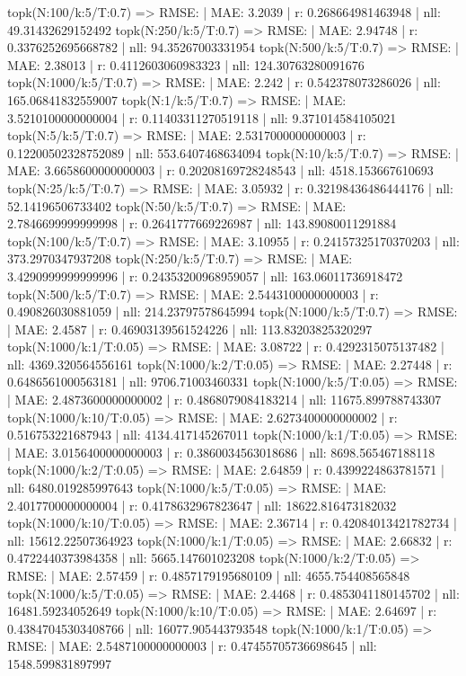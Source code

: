 topk(N:100/k:5/T:0.7) => RMSE: | MAE: 3.2039 | r: 0.268664981463948 | nll: 49.31432629152492
topk(N:250/k:5/T:0.7) => RMSE: | MAE: 2.94748 | r: 0.3376252695668782 | nll: 94.35267003331954
topk(N:500/k:5/T:0.7) => RMSE: | MAE: 2.38013 | r: 0.4112603060983323 | nll: 124.30763280091676
topk(N:1000/k:5/T:0.7) => RMSE: | MAE: 2.242 | r: 0.542378073286026 | nll: 165.06841832559007
topk(N:1/k:5/T:0.7) => RMSE: | MAE: 3.5210100000000004 | r: 0.11403311270519118 | nll: 9.371014584105021
topk(N:5/k:5/T:0.7) => RMSE: | MAE: 2.5317000000000003 | r: 0.12200502328752089 | nll: 553.6407468634094
topk(N:10/k:5/T:0.7) => RMSE: | MAE: 3.6658600000000003 | r: 0.20208169728248543 | nll: 4518.153667610693
topk(N:25/k:5/T:0.7) => RMSE: | MAE: 3.05932 | r: 0.32198436486444176 | nll: 52.14196506733402
topk(N:50/k:5/T:0.7) => RMSE: | MAE: 2.7846699999999998 | r: 0.2641777669226987 | nll: 143.89080011291884
topk(N:100/k:5/T:0.7) => RMSE: | MAE: 3.10955 | r: 0.24157325170370203 | nll: 373.2970347937208
topk(N:250/k:5/T:0.7) => RMSE: | MAE: 3.4290999999999996 | r: 0.24353200968959057 | nll: 163.06011736918472
topk(N:500/k:5/T:0.7) => RMSE: | MAE: 2.5443100000000003 | r: 0.490826030881059 | nll: 214.23797578645994
topk(N:1000/k:5/T:0.7) => RMSE: | MAE: 2.4587 | r: 0.46903139561524226 | nll: 113.83203825320297
topk(N:1000/k:1/T:0.05) => RMSE: | MAE: 3.08722 | r: 0.4292315075137482 | nll: 4369.320564556161
topk(N:1000/k:2/T:0.05) => RMSE: | MAE: 2.27448 | r: 0.6486561000563181 | nll: 9706.71003460331
topk(N:1000/k:5/T:0.05) => RMSE: | MAE: 2.4873600000000002 | r: 0.4868079084183214 | nll: 11675.899788743307
topk(N:1000/k:10/T:0.05) => RMSE: | MAE: 2.6273400000000002 | r: 0.516753221687943 | nll: 4134.417145267011
topk(N:1000/k:1/T:0.05) => RMSE: | MAE: 3.0156400000000003 | r: 0.3860034563018686 | nll: 8698.565467188118
topk(N:1000/k:2/T:0.05) => RMSE: | MAE: 2.64859 | r: 0.4399224863781571 | nll: 6480.019285997643
topk(N:1000/k:5/T:0.05) => RMSE: | MAE: 2.4017700000000004 | r: 0.4178632967823647 | nll: 18622.816473182032
topk(N:1000/k:10/T:0.05) => RMSE: | MAE: 2.36714 | r: 0.42084013421782734 | nll: 15612.22507364923
topk(N:1000/k:1/T:0.05) => RMSE: | MAE: 2.66832 | r: 0.4722440373984358 | nll: 5665.147601023208
topk(N:1000/k:2/T:0.05) => RMSE: | MAE: 2.57459 | r: 0.4857179195680109 | nll: 4655.754408565848
topk(N:1000/k:5/T:0.05) => RMSE: | MAE: 2.4468 | r: 0.4853041180145702 | nll: 16481.59234052649
topk(N:1000/k:10/T:0.05) => RMSE: | MAE: 2.64697 | r: 0.43847045303408766 | nll: 16077.905443793548
topk(N:1000/k:1/T:0.05) => RMSE: | MAE: 2.5487100000000003 | r: 0.47455705736698645 | nll: 1548.599831897997
